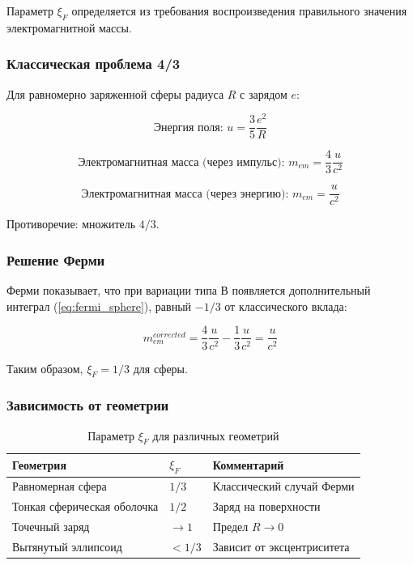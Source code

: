 \documentclass[12pt, a4paper]{article}
\begin{document}
Параметр $\xi_F$ определяется из требования воспроизведения правильного значения электромагнитной массы.

\subsubsection{Классическая проблема 4/3}

Для равномерно заряженной сферы радиуса $R$ с зарядом $e$:

\begin{equation}
\text{Энергия поля: } u = \frac{3}{5}\frac{e^2}{R}
\label{eq:field_energy}
\end{equation}

\begin{equation}
\text{Электромагнитная масса (через импульс): } m_{em} = \frac{4}{3}\frac{u}{c^2}
\label{eq:em_mass_momentum}
\end{equation}

\begin{equation}
\text{Электромагнитная масса (через энергию): } m_{em} = \frac{u}{c^2}
\label{eq:em_mass_energy}
\end{equation}

Противоречие: множитель $4/3$.

\subsubsection{Решение Ферми}

Ферми показывает, что при вариации типа В появляется дополнительный интеграл (\ref{eq:fermi_sphere}), равный $-1/3$ от классического вклада:

\begin{equation}
m_{em}^{corrected} = \frac{4}{3}\frac{u}{c^2} - \frac{1}{3}\frac{u}{c^2} = \frac{u}{c^2}
\label{eq:em_mass_corrected}
\end{equation}

Таким образом, $\xi_F = 1/3$ для сферы.

\subsubsection{Зависимость от геометрии}

\begin{table}[h]
\centering
\caption{Параметр $\xi_F$ для различных геометрий}
\begin{tabular}{|l|l|l|}
\hline
\textbf{Геометрия} & \textbf{$\xi_F$} & \textbf{Комментарий} \\
\hline
Равномерная сфера & $1/3$ & Классический случай Ферми \\
\hline
Тонкая сферическая оболочка & $1/2$ & Заряд на поверхности \\
\hline
Точечный заряд & $\to 1$ & Предел $R \to 0$ \\
\hline
Вытянутый эллипсоид & $< 1/3$ & Зависит от эксцентриситета \\
\hline
\end{tabular}
\label{tab:xi_F}
\end{table}
\end{document}
